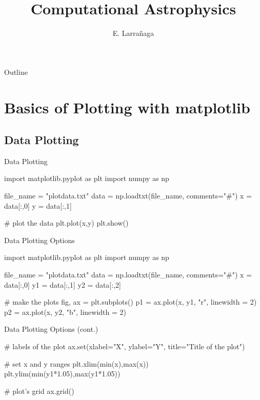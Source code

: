 \documentclass[11pt]{beamer}
\begin{document}
\begin{frame}
\title{Computational Astrophysics}
\author{E. Larrañaga}
\titlepage
\end{frame}

\begin{frame}{Outline}
\tableofcontents
\end{frame}

\section{Basics of Plotting with matplotlib}

\subsection{Data Plotting}
\begin{frame}[fragile]{Data Plotting}
\begin{semiverbatim}
import matplotlib.pyplot as plt 
import numpy as np

file_name = "plotdata.txt" 
data = np.loadtxt(file_name, comments="#") 
x = data[:,0]
y = data[:,1]

# plot the data 
plt.plot(x,y) 
plt.show()
\end{semiverbatim}
\end{frame}

\begin{frame}[fragile]{Data Plotting Options}
\begin{semiverbatim}
import matplotlib.pyplot as plt 
import numpy as np

file_name = "plotdata.txt" 
data = np.loadtxt(file_name, comments="#") 
x = data[:,0]
y1 = data[:,1]
y2 = data[:,2]

# make the plots
fig, ax = plt.subplots()
p1 = ax.plot(x, y1, "r", linewidth = 2)
p2 = ax.plot(x, y2, "b", linewidth = 2)
\end{semiverbatim}
\end{frame}

\begin{frame}[fragile]{Data Plotting Options (cont.)}
\begin{semiverbatim}
# labels of the plot
ax.set(xlabel="X", ylabel="Y",
    title="Title of the plot")

# set x and y ranges 
plt.xlim(min(x),max(x)) 
plt.ylim(min(y1*1.05),max(y1*1.05))

# plot's grid
ax.grid()
\end{semiverbatim}
\end{frame}
\end{document}
